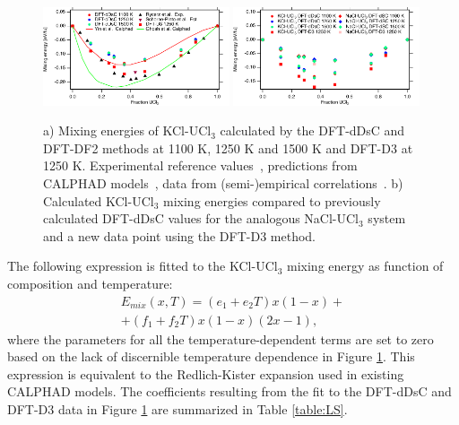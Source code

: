 \documentclass[preprint,3p,10pt,twocolumn,number,sort&compress]{elsarticle}
\begin{document}
\begin{figure}[htb]
\centering
\includegraphics[width=0.49\textwidth]{KCl_UCl3_energy.pdf} \includegraphics[width=0.49\textwidth]{NaCl_UCl3_energy.pdf}
\caption{a) Mixing energies of KCl-UCl$_3$ calculated by the DFT-dDsC and DFT-DF2 methods at 1100 K, 1250 K and 1500 K and DFT-D3 at 1250 K. Experimental reference values~\cite{Rycerz}, predictions from CALPHAD models~\cite{YIN2020,Ghosh}, data from (semi-)empirical correlations~\cite{Pinto}. 
b) Calculated KCl-UCl$_3$ mixing energies compared to previously calculated DFT-dDsC values for the analogous NaCl-UCl$_3$ system~\cite{Andersson} and a new data point using the DFT-D3 method. }
\label{fig:KCl_UCl3_energy}
\end{figure}

The following expression is fitted to the KCl-UCl$_3$ mixing energy as function of composition and temperature:
\begin{equation}
\begin{split}
E_{mix}(x,T)=(e_1+e_2T)x(1-x)+\\
+(f_1+f_2T)x(1-x)(2x-1),
\label{eq:LSE}
\end{split}
\end{equation}
where the parameters for all the temperature-dependent terms are set to zero based on the lack of discernible temperature dependence in Figure \ref{fig:KCl_UCl3_energy}. This expression is equivalent to the Redlich-Kister expansion used in existing CALPHAD models. The coefficients resulting from the fit to the DFT-dDsC and DFT-D3 data in Figure \ref{fig:KCl_UCl3_energy} are summarized in Table \ref{table:LS}. 
\end{document}
